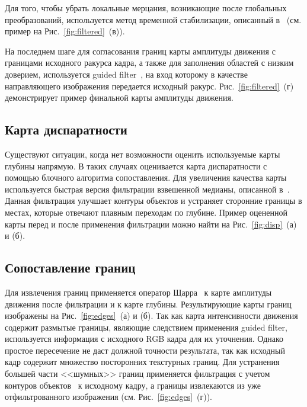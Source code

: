 \documentclass[14pt, a4paper]{extarticle}
\begin{document}
Для того, чтобы убрать локальные мерцания, возникающие после глобальных преобразований,
используется метод временной стабилизации, описанный в~\cite{matyunin2011temporal} 
(см. пример на Рис.~\ref{fig:filtered}~(в)).

На последнем шаге для согласования границ карты амплитуды движения с границами 
исходного ракурса кадра, а также для заполнения областей с низким доверием,
используется guided filter~\cite{he2013guided}, на вход которому в качестве
направляющего изображения передается исходный ракурс. Рис.~\ref{fig:filtered}~(г)
демонстрирует пример финальной карты амплитуды движения.

\subsection{Карта диспаратности}



Существуют ситуации, когда нет возможности оценить используемые карты глубины напрямую. 
В таких случаях оценивается карта диспаратности с помощью блочного алгоритма сопоставления. 
Для увеличения качества карты используется быстрая версия фильтрации взвешенной медианы,
описанной в~\cite{zhang2014100+}. Данная фильтрация улучшает контуры объектов и
устраняет сторонние границы в местах, которые отвечают плавным переходам по глубине.
Пример оцененной карты перед и после применения фильтрации можно найти на Рис.~\ref{fig:disp}~(а) и (б).

\subsection{Сопоставление границ}



Для извлечения границ применяется оператор Щарра~\cite{jahne1999principles} к карте
амплитуды движения после фильтрации и к карте глубины. Результирующие карты границ
изображены на Рис.~\ref{fig:edges}~(а) и (б). Так как карта интенсивности движения
содержит размытые границы, являющие следствием применения guided filter, используется
информация с исходного RGB кадра для их уточнения. Однако простое пересечение не даст
должной точности результата, так как исходный кадр содержит множество посторонних текстурных
границ. Для устранения большей части <<шумных>> границ применяется фильтрация
с учетом контуров объектов~\cite{zhang2014rolling} к исходному кадру, а границы извлекаются 
из уже отфильтрованного изображения (см. Рис.~\ref{fig:edges}~(г)).
\end{document}

